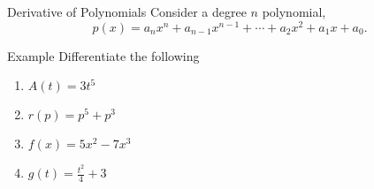 \documentclass[Lecture.tex]{subfiles}
\begin{document}
\begin{frame}{Derivative of Polynomials}
  Consider a degree $n$ polynomial,
  $$p(x) = a_nx^n + a_{n-1}x^{n-1} + \cdots + a_2x^2 + a_1x + a_0.$$
\end{frame}

\begin{frame}{Example}
  Differentiate the following
  \begin{multicols}{2}
    \begin{enumerate}
    \item<alert@2-6>
      $A(t) = 3t^5$
    \item<alert@7-10>
      $r(p) = p^5 + p^3$
    \item<alert@11-16>
      $f(x) = 5x^2 - 7x^3$
    \item<alert@17->
      $g(t) = \frac{t^2}{4} + 3$
    \end{enumerate}
  \end{multicols}
  

\end{frame}
\end{document}
